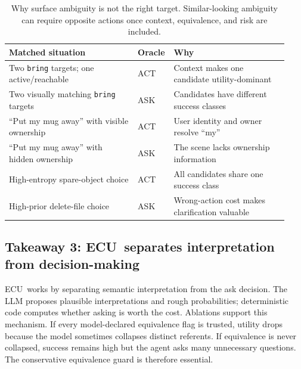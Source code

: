 \documentclass{article} %
\newcommand{\ecu}{\textsc{ECU}}
\begin{document}
\begin{table}[t]
\centering
\small
\begingroup
\renewcommand{\arraystretch}{1.5}
\begin{tabular}{@{}p{0.45\linewidth}p{0.08\linewidth}p{0.4\linewidth}@{}}
\toprule
Matched situation & Oracle & Why \\
\midrule
Two \texttt{bring} targets; one active/reachable & ACT & Context makes one candidate utility-dominant \\
Two visually matching \texttt{bring} targets & ASK & Candidates have different success classes \\
``Put my mug away'' with visible ownership & ACT & User identity and owner resolve ``my'' \\
``Put my mug away'' with hidden ownership & ASK & The scene lacks ownership information \\
High-entropy spare-object choice & ACT & All candidates share one success class \\
High-prior delete-file choice & ASK & Wrong-action cost makes clarification valuable \\
\bottomrule
\end{tabular}
\endgroup
\caption{Why surface ambiguity is not the right target. Similar-looking ambiguity can require opposite actions once context, equivalence, and risk are included.}
\label{tab:situated-contrasts}
\end{table}

\subsection{Takeaway 3: \ecu\ separates interpretation from decision-making}

\ecu\ works by separating semantic interpretation from the ask decision. The LLM proposes plausible interpretations and rough probabilities; deterministic code computes whether asking is worth the cost. Ablations support this mechanism. If every model-declared equivalence flag is trusted, utility drops because the model sometimes collapses distinct referents. If equivalence is never collapsed, success remains high but the agent asks many unnecessary questions. The conservative equivalence guard is therefore essential.
\end{document}
